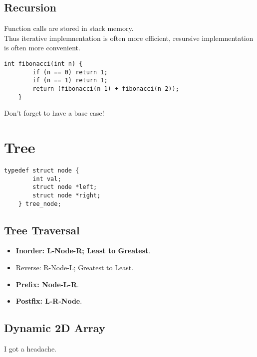 \documentclass{article}
\begin{document}
\subsection{Recursion}
Function calls are stored in stack memory.\\
Thus iterative implemnentation is often more efficient, resursive implemnentation is often more convenient.
\begin{lstlisting}[style=CStyle]
    int fibonacci(int n) {
        if (n == 0) return 1;
        if (n == 1) return 1;
        return (fibonacci(n-1) + fibonacci(n-2));
    }
\end{lstlisting}
Don't forget to have a base case!

\section{Tree}
\begin{lstlisting}[style=CStyle]
    typedef struct node {
        int val;
        struct node *left;
        struct node *right;
    } tree_node;
\end{lstlisting}

\subsection{Tree Traversal}
\begin{itemize}
    \item \textbf{Inorder: L-Node-R; Least to Greatest}.
    \item Reverse: R-Node-L; Greatest to Least.
    \item \textbf{Prefix: Node-L-R}.
    \item \textbf{Postfix: L-R-Node}.
\end{itemize}

\subsection{Dynamic 2D Array}
I got a headache.
\end{document}
